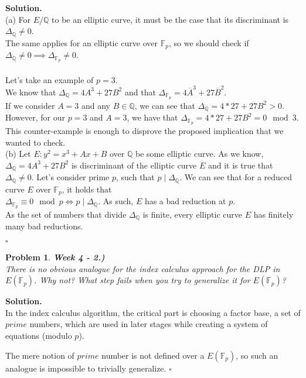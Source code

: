 \documentclass[12pt]{article}
\newtheorem{problem}{Problem}
\newenvironment{solution}[1][\textbf{Solution}]{\textbf{#1.} }{$\square$}
\begin{document}
\begin{solution}\\

(a) For $E/\mathbb{Q}$ to be an elliptic curve, it must be the case that its discriminant is $\Delta_{\mathbb{Q}} \neq 0$. \\ 
The same applies for an elliptic curve over $\mathbb{F}_p$, so we should check if $\Delta_{\mathbb{Q}} \neq 0 \implies \Delta_{\mathbb{F}_p} \neq 0$. \\ \\
Let's take an example of $p = 3$. \\
We know that $\Delta_{\mathbb{Q}} = 4A^3 + 27B^2$ and that $\Delta_{\mathbb{F}_p} = 4\overline{A}^3 + 27 \overline{B}^2$. \\
If we consider $A=3$ and any $B \in \mathbb{Q}$, we can see that $\Delta_{\mathbb{Q}} = 4 * 27 + 27B^2 > 0$. \\
However, for our $p=3$ and $A=3$, we have that  $\Delta_{\mathbb{F}_p} = 4 * 27 + 27B^2 = 0 \mod 3$. \\
This counter-example is enough to disprove the proposed implication that we wanted to check. \\ 

(b) Let $E: y^2 = x^3 + Ax + B$ over $\mathbb{Q}$ be some elliptic curve. As we know, $\Delta_{\mathbb{Q}} = 4A^3+27B^2$ is discriminant of the elliptic curve $E$ and it is true that $\Delta_{\mathbb{Q}} \neq 0$. 
Let's consider prime $p$, such that $p \mid \Delta_{\mathbb{Q}}$. We can see that for a reduced curve $E$ over $\mathbb{F}_p$, it holds that \\ $\Delta_{\mathbb{F}_p} \equiv 0 \mod p \iff p \mid \Delta_{\mathbb{Q}}$. As such, $E$ has a bad reduction at $p$. \\

As the set of numbers that divide $\Delta_{\mathbb{Q}}$ is finite, every elliptic curve $E$ has finitely many bad reductions.

\end{solution} 

\begin{problem} \textbf{Week 4 - 2.)} \\ 

There is no obvious analogue for the index calculus approach for the DLP in $E(\mathbb{F}_p)$. Why not? What step fails when you try to generalize it for $E(\mathbb{F}_p)$?
\end{problem}
\begin{solution} \\
In the index calculus algorithm, the critical part is choosing a factor base, a set of $prime$ numbers, which are used in later stages while creating a system of equations (modulo $p$).

The mere notion of $prime$ number is not defined over a $E(\mathbb{F}_p)$, so such an analogue is impossible to trivially generalize. 
\end{solution}
\end{document}

